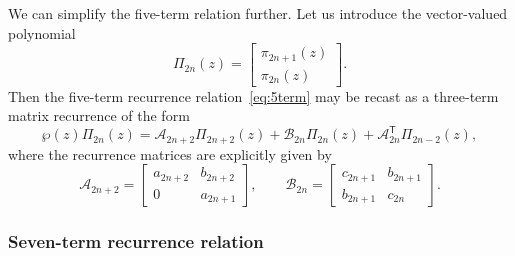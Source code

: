 \documentclass[11pt,a4paper]{article}
\theoremstyle{definition}
\numberwithin{equation}{section}
\numberwithin{theorem}{section}
\begin{document}
We can simplify the five-term relation further. Let us introduce the vector-valued polynomial
\[
\Pi_{2n}(z) = 
\begin{bmatrix}
    \pi_{2n+1}(z) \\
    \pi_{2n}(z)
\end{bmatrix}.
\]
Then the five-term recurrence relation~\eqref{eq:5term} may be recast as a three-term matrix recurrence of the form
\begin{equation} \label{eq:matrix-recurrence}
    \wp(z)\Pi_{2n}(z) = \mathcal{A}_{2n+2} \Pi_{2n+2}(z) + \mathcal{B}_{2n} \Pi_{2n}(z) + \mathcal{A}_{2n}^{\mathsf{T}} \Pi_{2n-2}(z),
\end{equation}
where the recurrence matrices are explicitly given by
\begin{equation} \label{eq:rec-matrices}
    \mathcal{A}_{2n+2} = 
    \begin{bmatrix}
        a_{2n+2} & b_{2n+2} \\
        0 & a_{2n+1}
    \end{bmatrix}, 
    \qquad
    \mathcal{B}_{2n} = 
    \begin{bmatrix}
        c_{2n+1} & b_{2n+1} \\
        b_{2n+1} & c_{2n}
    \end{bmatrix}.
\end{equation}

\subsubsection{Seven-term recurrence relation}
\end{document}
